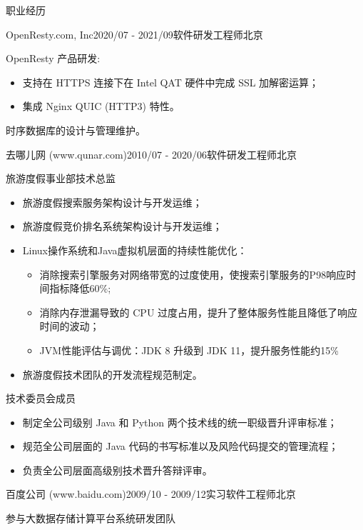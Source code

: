 \documentclass{resume} %
\begin{document}
\begin{rSection}{职业经历}

  \begin{rSubsection}{OpenResty.com, Inc}{2020/07 - 2021/09}{软件研发工程师}{北京}
  \item OpenResty 产品研发:
    \begin {itemize}
    \item 支持在 HTTPS 连接下在 Intel QAT 硬件中完成 SSL 加解密运算；
    \item 集成 Nginx QUIC (HTTP3) 特性。
    \end{itemize}
  \item 时序数据库的设计与管理维护。
  \end{rSubsection}

  \begin{rSubsection}{去哪儿网 (www.qunar.com)}{2010/07 - 2020/06}{软件研发工程师}{北京}

  \item 旅游度假事业部技术总监
    \begin{itemize}
    \item 旅游度假搜索服务架构设计与开发运维；
    \item 旅游度假竞价排名系统架构设计与开发运维；
    \item {
        Linux操作系统和Java虚拟机层面的持续性能优化：
        \begin{itemize}
        \item { 消除搜索引擎服务对网络带宽的过度使用，使搜索引擎服务的P98响应时间指标降低60\%; }
        \item { 消除内存泄漏导致的 CPU 过度占用，提升了整体服务性能且降低了响应时间的波动； }
        \item { JVM性能评估与调优：JDK 8 升级到 JDK 11，提升服务性能约15\% }
        \end{itemize}
      }
    \item 旅游度假技术团队的开发流程规范制定。
    \end{itemize}
  \item 技术委员会成员
    \begin{itemize}
    \item 制定全公司级别 Java 和 Python 两个技术线的统一职级晋升评审标准；
    \item 规范全公司层面的 Java 代码的书写标准以及风险代码提交的管理流程；
    \item 负责全公司层面高级别技术晋升答辩评审。
    \end{itemize}
    
  \end{rSubsection}


  \begin{rSubsection}{百度公司 (www.baidu.com)}{2009/10 - 2009/12}{实习软件工程师}{北京}
  \item 参与大数据存储计算平台系统研发团队
  \end{rSubsection}

\end{rSection}
\end{document}
